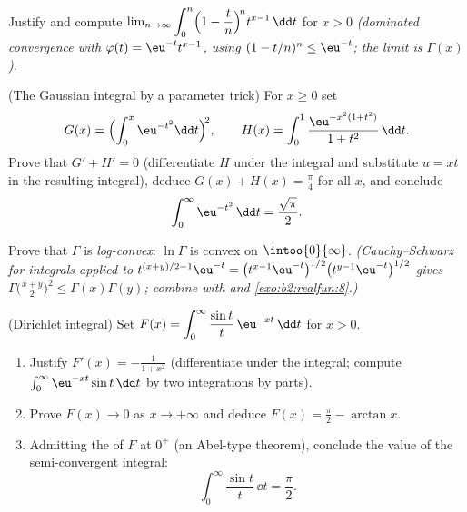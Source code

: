 \begin{exercise}[$\star\star$]\label{exo:b2:integration:7}
Justify and compute $\lim_{n\to\infty} \displaystyle\int_0^n
\Bigl(1 - \frac tn\Bigr)^{\!n} t^{x-1}\,\dd t$ for $x > 0$
\emph{(dominated convergence with $\varphi(t) = \eu^{-t}t^{x-1}$,
using $(1 - t/n)^n \leq \eu^{-t}$; the limit is $\Gamma(x)$)}.
\end{exercise}

\begin{exercise}[$\star\star\star$]\label{exo:b2:integration:8}
(The Gaussian integral by a parameter trick) For $x \geq 0$ set
\[
G(x) = \Bigl(\int_0^x \eu^{-t^2}\dd t\Bigr)^{\!2},
\qquad
H(x) = \int_0^1 \frac{\eu^{-x^2(1+t^2)}}{1 + t^2}\,\dd t .
\]
Prove that $G' + H' = 0$ (differentiate $H$ under the integral and
substitute $u = xt$ in the resulting integral), deduce $G(x) + H(x)
= \frac\pi4$ for all $x$, and conclude
\[
\int_0^{\infty} \eu^{-t^2}\,\dd t = \frac{\sqrt\pi}{2} .
\]
\end{exercise}

\begin{exercise}[$\star\star\star$]\label{exo:b2:integration:9}
Prove that $\Gamma$ is \emph{log-convex}: $\ln\Gamma$ is convex on
$\intoo{0}{\infty}$. \emph{(Cauchy--Schwarz for integrals applied
to $t^{(x+y)/2 - 1}\eu^{-t} = \bigl(t^{x-1}\eu^{-t}\bigr)^{1/2}
\bigl(t^{y-1}\eu^{-t}\bigr)^{1/2}$ gives
$\Gamma\bigl(\frac{x+y}{2}\bigr)^2 \leq \Gamma(x)\Gamma(y)$;
combine with  and \cref{exo:b2:realfun:8}.)}
\end{exercise}

\begin{exercise}[$\star\star\star$]\label{exo:b2:integration:10}
(Dirichlet integral) Set $F(x) = \displaystyle\int_0^{\infty}
\frac{\sin t}{t}\,\eu^{-xt}\,\dd t$ for $x > 0$.
\begin{enumerate}
  \item Justify $F'(x) = -\frac{1}{1 + x^2}$ (differentiate under
        the integral; compute $\int_0^\infty \eu^{-xt}\sin t\,\dd
        t$ by two integrations by parts).
  \item Prove $F(x) \to 0$ as $x \to +\infty$ and deduce $F(x) =
        \frac\pi2 - \arctan x$.
  \item Admitting the  of $F$ at $0^+$ (an Abel-type
        theorem), conclude the value of the semi-convergent
        integral:
        \[
        \int_0^{\infty} \frac{\sin t}{t}\,\dd t = \frac{\pi}{2}.
        \]
\end{enumerate}
\end{exercise}

